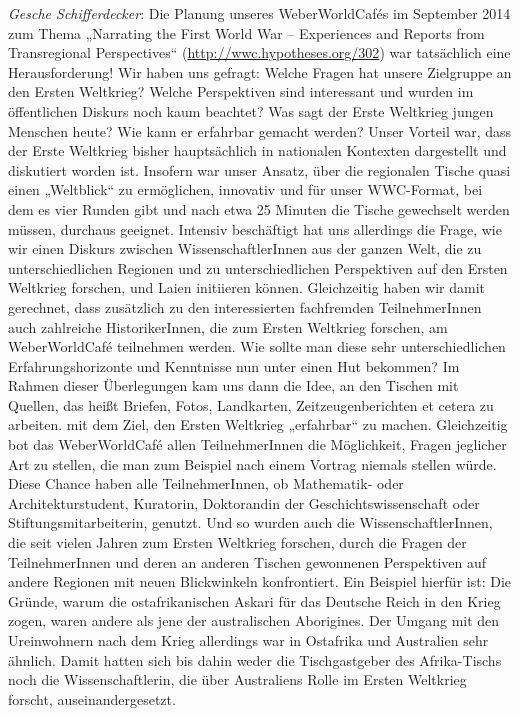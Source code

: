 \documentclass[a4paper,
fontsize=11pt,
oneside,
numbers=noperiodatend,
parskip=half-,
bibliography=totoc,
final
]{scrartcl}
\begin{document}
\emph{Gesche Schifferdecker}: Die Planung unseres WeberWorldCafés im
September 2014 zum Thema „Narrating the First World War -- Experiences
and Reports from Transregional Perspectives``
(\url{http://wwc.hypotheses.org/302}) war tatsächlich eine
Herausforderung! Wir haben uns gefragt: Welche Fragen hat unsere
Zielgruppe an den Ersten Weltkrieg? Welche Perspektiven sind interessant
und wurden im öffentlichen Diskurs noch kaum beachtet? Was sagt der
Erste Weltkrieg jungen Menschen heute? Wie kann er erfahrbar gemacht
werden? Unser Vorteil war, dass der Erste Weltkrieg bisher hauptsächlich
in nationalen Kontexten dargestellt und diskutiert worden ist. Insofern
war unser Ansatz, über die regionalen Tische quasi einen „Weltblick`` zu
ermöglichen, innovativ und für unser WWC-Format, bei dem es vier Runden
gibt und nach etwa 25 Minuten die Tische gewechselt werden müssen,
durchaus geeignet. Intensiv beschäftigt hat uns allerdings die Frage,
wie wir einen Diskurs zwischen WissenschaftlerInnen aus der ganzen Welt,
die zu unterschiedlichen Regionen und zu unterschiedlichen Perspektiven
auf den Ersten Weltkrieg forschen, und Laien initiieren können.
Gleichzeitig haben wir damit gerechnet, dass zusätzlich zu den
interessierten fachfremden TeilnehmerInnen auch zahlreiche
HistorikerInnen, die zum Ersten Weltkrieg forschen, am WeberWorldCafé
teilnehmen werden. Wie sollte man diese sehr unterschiedlichen
Erfahrungshorizonte und Kenntnisse nun unter einen Hut bekommen? Im
Rahmen dieser Überlegungen kam uns dann die Idee, an den Tischen mit
Quellen, das heißt Briefen, Fotos, Landkarten, Zeitzeugenberichten et
cetera zu arbeiten. mit dem Ziel, den Ersten Weltkrieg „erfahrbar`` zu
machen. Gleichzeitig bot das WeberWorldCafé allen TeilnehmerInnen die
Möglichkeit, Fragen jeglicher Art zu stellen, die man zum Beispiel nach
einem Vortrag niemals stellen würde. Diese Chance haben alle
TeilnehmerInnen, ob Mathematik- oder Architekturstudent, Kuratorin,
Doktorandin der Geschichtswissenschaft oder Stiftungsmitarbeiterin,
genutzt. Und so wurden auch die WissenschaftlerInnen, die seit vielen
Jahren zum Ersten Weltkrieg forschen, durch die Fragen der
TeilnehmerInnen und deren an anderen Tischen gewonnenen Perspektiven auf
andere Regionen mit neuen Blickwinkeln konfrontiert. Ein Beispiel
hierfür ist: Die Gründe, warum die ostafrikanischen Askari für das
Deutsche Reich in den Krieg zogen, waren andere als jene der
australischen Aborigines. Der Umgang mit den Ureinwohnern nach dem Krieg
allerdings war in Ostafrika und Australien sehr ähnlich. Damit hatten
sich bis dahin weder die Tischgastgeber des Afrika-Tischs noch die
Wissenschaftlerin, die über Australiens Rolle im Ersten Weltkrieg
forscht, auseinandergesetzt.
\end{document}
